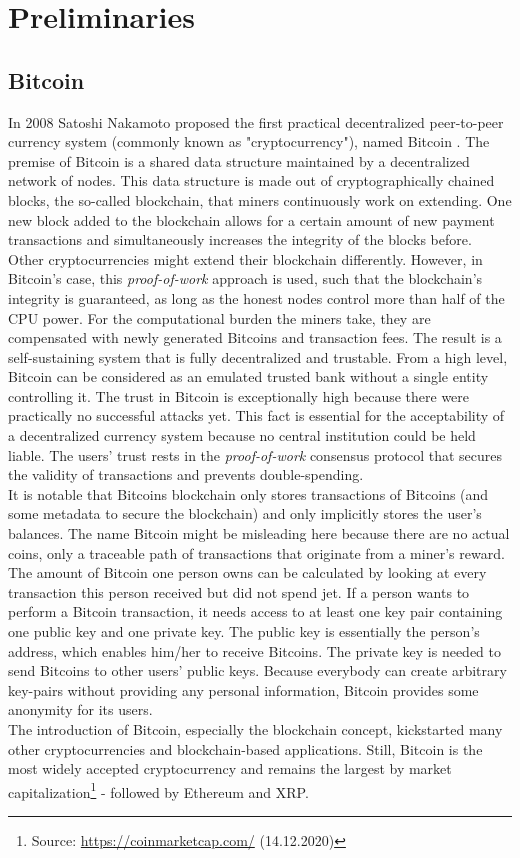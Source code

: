 \documentclass{cacthesis}
\newcounter{protocol}
\begin{document}
    \chapter{Preliminaries}
        \section{Bitcoin}
        In 2008 Satoshi Nakamoto proposed the first practical decentralized peer-to-peer currency system (commonly known as "cryptocurrency"), named Bitcoin \cite{nakamoto2009bitcoin}. The premise of Bitcoin is a shared data structure maintained by a decentralized network of nodes. This data structure is made out of cryptographically chained blocks, the so-called blockchain, that miners continuously work on extending. One new block added to the blockchain allows for a certain amount of new payment transactions and simultaneously increases the integrity of the blocks before. Other cryptocurrencies might extend their blockchain differently. However, in Bitcoin's case, this \textit{proof-of-work} approach is used, such that the blockchain's integrity is guaranteed, as long as the honest nodes control more than half of the CPU power. For the computational burden the miners take, they are compensated with newly generated Bitcoins and transaction fees. The result is a self-sustaining system that is fully decentralized and trustable. From a high level, Bitcoin can be considered as an emulated trusted bank without a single entity controlling it.  The trust in Bitcoin is exceptionally high because there were practically no successful attacks yet. This fact is essential for the acceptability of a decentralized currency system because no central institution could be held liable. The users' trust rests in the \textit{proof-of-work} consensus protocol that secures the validity of transactions and prevents double-spending. \\
        It is notable that Bitcoins blockchain only stores transactions of Bitcoins (and some metadata to secure the blockchain) and only implicitly stores the user's balances. The name Bitcoin might be misleading here because there are no actual coins, only a traceable path of transactions that originate from a miner's reward. The amount of Bitcoin one person owns can be calculated by looking at every transaction this person received but did not spend jet. If a person wants to perform a Bitcoin transaction, it needs access to at least one key pair containing one public key and one private key. The public key is essentially the person's address, which enables him/her to receive Bitcoins. The private key is needed to send Bitcoins to other users' public keys. Because everybody can create arbitrary key-pairs without providing any personal information, Bitcoin provides some anonymity for its users. \\
        The introduction of Bitcoin, especially the blockchain concept, kickstarted many other cryptocurrencies and blockchain-based applications. Still, Bitcoin is the most widely accepted cryptocurrency and remains the largest by market capitalization\footnote{Source: \url{https://coinmarketcap.com/} (14.12.2020)} - followed by Ethereum and XRP.
\end{document}
